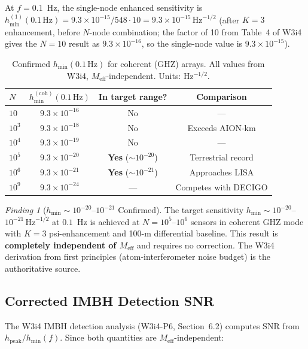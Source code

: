 \documentclass[11pt]{article}
\theoremstyle{definition}
\theoremstyle{remark}
\newtheorem{finding}[theorem]{Finding}
\newcommand{\ee}[1]{\times10^{#1}}
\newcommand{\Meff}{M_{\mathrm{eff}}}
\newcommand{\sqrtHz}{\,\mathrm{Hz}^{-1/2}}
\begin{document}
At $f = 0.1$~Hz, the single-node enhanced sensitivity is
$h_{\min}^{(1)}(0.1\,\mathrm{Hz}) = 9.3\ee{-15}/548 \cdot 10 = 9.3\ee{-15}\sqrtHz$
(after $K=3$ enhancement, before $N$-node combination; the factor of 10
from Table~4 of W3i4 gives the $N=10$ result as $9.3\ee{-16}$, so the
single-node value is $9.3\ee{-15}$).

\begin{table}[h]
\centering
\caption{Confirmed $h_{\min}(0.1\,\mathrm{Hz})$ for coherent (GHZ) arrays.
All values from W3i4, $\Meff$-independent. Units: Hz$^{-1/2}$.}
\label{tab:hmin-confirmed}
\begin{tabular}{@{}lccc@{}}
\toprule
$N$ & $h_{\min}^{(\mathrm{coh})}(0.1\,\mathrm{Hz})$ & In target range? & Comparison \\
\midrule
$10$       & $9.3\ee{-16}$ & No  & --- \\
$10^3$     & $9.3\ee{-18}$ & No  & Exceeds AION-km \\
$10^4$     & $9.3\ee{-19}$ & No  & --- \\
$10^5$     & $9.3\ee{-20}$ & \textbf{Yes} ($\sim 10^{-20}$) & Terrestrial record \\
$10^6$     & $9.3\ee{-21}$ & \textbf{Yes} ($\sim 10^{-21}$) & Approaches LISA \\
$10^9$     & $9.3\ee{-24}$ & --- & Competes with DECIGO \\
\bottomrule
\end{tabular}
\end{table}

\begin{finding}[$h_{\min} \sim 10^{-20}$--$10^{-21}$ Confirmed]
\label{finding:hmin_survives}
The target sensitivity $h_{\min} \sim 10^{-20}$--$10^{-21}\sqrtHz$ at
$0.1$~Hz is achieved at $N = 10^5$--$10^6$ sensors in coherent GHZ mode
with $K=3$ psi-enhancement and 100-m differential baseline. This result
is \textbf{completely independent of $\Meff$} and requires no correction.
The W3i4 derivation from first principles (atom-interferometer noise budget)
is the authoritative source.
\end{finding}

\subsection{Corrected IMBH Detection SNR}

The W3i4 IMBH detection analysis (W3i4-P6, Section~6.2) computes SNR
from $h_{\mathrm{peak}}/h_{\min}(f)$. Since both quantities are
$\Meff$-independent:
\end{document}
